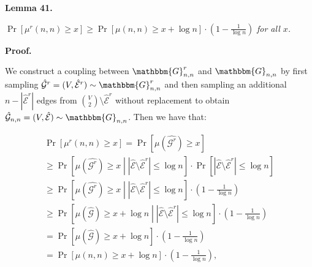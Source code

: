 

\par\medskip\noindent\textbf{\textbf{Lemma 41}\textbf{.}}\par



$\Pr\left[\mu^{r}(n,n)\geq x\right]\geq\Pr\left[\mu(n,n)\geq x+\log{n}\right]\cdot\left(1-\frac{1}{\log{n}}\right)$\emph{ for all $x$.}\par






\par\medskip\noindent\textbf{Proof.}\par



We construct a coupling between $\mathbbm{G}^{r}_{n,n}$ and $\mathbbm{G}_{n,n}$ by first sampling $\hat{\mathcal{G}}^{r}=(V,\hat{\mathcal{E}}^{r})\sim\mathbbm{G}^{r}_{n,n}$ and then sampling an additional $n-|\hat{\mathcal{E}}^{r}|$ edges from $\binom{V}{2}\setminus\hat{\mathcal{E}}^{r}$ without replacement to obtain $\hat{\mathcal{G}}_{n,n}=(V,\hat{\mathcal{E}})\sim\mathbbm{G}_{n,n}$.
Then we have that:\par


\[\begin{gathered}
\displaystyle\Pr\left[\mu^{r}(n,n)\geq x\right] \displaystyle=\Pr\left[\mu(\hat{\mathcal{G}^{r}})\geq x\right] \\
\displaystyle\geq\Pr\left[\mu(\hat{\mathcal{G}^{r}})\geq x\middle||\hat{\mathcal{E}}\setminus\hat{\mathcal{E}}^{r}|\leq\log{n}\right]\cdot\Pr\left[|\hat{\mathcal{E}}\setminus\hat{\mathcal{E}}^{r}|\leq\log{n}\right] \\
\displaystyle\geq\Pr\left[\mu(\hat{\mathcal{G}^{r}})\geq x\middle||\hat{\mathcal{E}}\setminus\hat{\mathcal{E}}^{r}|\leq\log{n}\right]\cdot\left(1-\frac{1}{\log{n}}\right) \\
\displaystyle\geq\Pr\left[\mu(\hat{\mathcal{G}})\geq x+\log{n}\middle||\hat{\mathcal{E}}\setminus\hat{\mathcal{E}}^{r}|\leq\log{n}\right]\cdot\left(1-\frac{1}{\log{n}}\right) \\
\displaystyle=\Pr\left[\mu(\hat{\mathcal{G}})\geq x+\log{n}\right]\cdot\left(1-\frac{1}{\log{n}}\right) \\
\displaystyle=\Pr\left[\mu(n,n)\geq x+\log{n}\right]\cdot\left(1-\frac{1}{\log{n}}\right),
\end{gathered}\]


